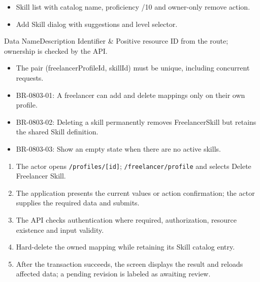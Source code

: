 \begin{itemize}[leftmargin=1.6em,topsep=3pt,itemsep=2pt,parsep=0pt,label=$\bullet$]
    \item Skill list with catalog name, proficiency /10 and owner-only remove action.
    \item Add Skill dialog with suggestions and level selector.
\end{itemize}


\begin{specdatatable}{Data Name}{Description}
Identifier & Positive resource ID from the route; ownership is checked by the API.\\ \hline
\end{specdatatable}

\begin{itemize}[leftmargin=1.6em,topsep=3pt,itemsep=2pt,parsep=0pt,label=$\bullet$]
    \item The pair (freelancerProfileId, skillId) must be unique, including concurrent requests.
\end{itemize}

\begin{itemize}[leftmargin=1.6em,topsep=3pt,itemsep=2pt,parsep=0pt,label=$\bullet$]\brrulelist
    \item BR-0803-01: A freelancer can add and delete mappings only on their own profile.
    \item BR-0803-02: Deleting a skill permanently removes FreelancerSkill but retains the shared Skill definition.
    \item BR-0803-03: Show an empty state when there are no active skills.
\end{itemize}

\begin{enumerate}[leftmargin=1.8em,topsep=3pt,itemsep=2pt,parsep=0pt]
    \item The actor opens \texttt{/\allowbreak{}profiles/\allowbreak{}[id]}; \texttt{/\allowbreak{}freelancer/\allowbreak{}profile} and selects Delete Freelancer Skill.
    \item The application presents the current values or action confirmation; the actor supplies the required data and submits.
    \item The API checks authentication where required, authorization, resource existence and input validity.
    \item Hard-delete the owned mapping while retaining its Skill catalog entry.
    \item After the transaction succeeds, the screen displays the result and reloads affected data; a pending revision is labeled as awaiting review.
\end{enumerate}

